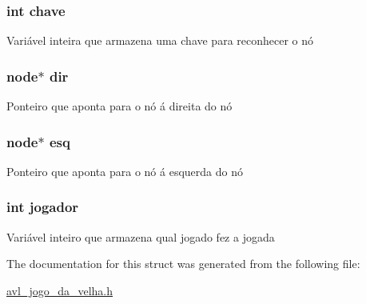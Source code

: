 \subsubsection[{\texorpdfstring{chave}{chave}}]{\setlength{\rightskip}{0pt plus 5cm}int chave}\hypertarget{structnode_a4a9a339d4d22e3b9e5fd31964220a195}{}\label{structnode_a4a9a339d4d22e3b9e5fd31964220a195}
Variável inteira que armazena uma chave para reconhecer o nó 
\subsubsection[{\texorpdfstring{dir}{dir}}]{ {\bf node}$\ast$ dir}\hypertarget{structnode_aa053c9a92b1215050c3f9d90646dd612}{}\label{structnode_aa053c9a92b1215050c3f9d90646dd612}
Ponteiro que aponta para o nó á direita do nó 
\subsubsection[{\texorpdfstring{esq}{esq}}]{ {\bf node}$\ast$ esq}\hypertarget{structnode_a2d0c3d7f54adedaa369899f4df5a4b6a}{}\label{structnode_a2d0c3d7f54adedaa369899f4df5a4b6a}
Ponteiro que aponta para o nó á esquerda do nó 
\subsubsection[{\texorpdfstring{jogador}{jogador}}]{\setlength{\rightskip}{0pt plus 5cm}int jogador}\hypertarget{structnode_adff0ea2ada1722208aa1c811d1019d39}{}\label{structnode_adff0ea2ada1722208aa1c811d1019d39}
Variável inteiro que armazena qual jogado fez a jogada 

The documentation for this struct was generated from the following file\+:\begin{DoxyCompactItemize}
\item 
\hyperlink{avl__jogo__da__velha_8h}{avl\+\_\+jogo\+\_\+da\+\_\+velha.\+h}\end{DoxyCompactItemize}
